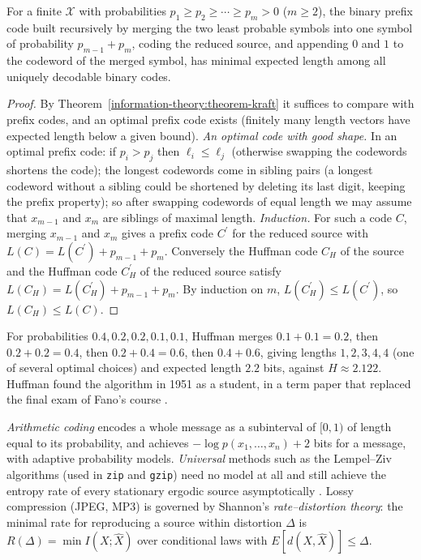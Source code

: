 \begin{theorem}[Huffman]\label{information-theory:theorem-huffman}
For a finite $\mathcal{X}$ with probabilities $p_1 \geq p_2 \geq \cdots \geq p_m > 0$ ($m \geq 2$), the binary prefix code built recursively by merging the two least probable symbols into one symbol of probability $p_{m-1} + p_m$,
coding the reduced source, and appending $0$ and $1$ to the codeword of the merged symbol, has minimal expected length among all uniquely decodable binary codes.
\end{theorem}

\begin{proof}
By Theorem~\ref{information-theory:theorem-kraft} it suffices to compare with prefix codes, and an optimal prefix code exists (finitely many length vectors have expected length below a given bound). \emph{An optimal code with
good shape.} In an optimal prefix code: if $p_i > p_j$ then $\ell_i \leq \ell_j$ (otherwise swapping the codewords shortens the code); the longest codewords come in sibling pairs (a longest codeword without a sibling could be
shortened by deleting its last digit, keeping the prefix property); so after swapping codewords of equal length we may assume that $x_{m-1}$ and $x_m$ are siblings of maximal length. \emph{Induction.} For such a code $C$,
merging $x_{m-1}$ and $x_m$ gives a prefix code $C^{\prime}$ for the reduced source with $L(C) = L(C^{\prime}) + p_{m-1} + p_m$. Conversely the Huffman code $C_H$ of the source and the Huffman code $C_H^{\prime}$ of the reduced source satisfy
$L(C_H) = L(C_H^{\prime}) + p_{m-1} + p_m$. By induction on $m$, $L(C_H^{\prime}) \leq L(C^{\prime})$, so $L(C_H) \leq L(C)$.
\end{proof}

\begin{example}\label{information-theory:example-huffman}
For probabilities $0.4, 0.2, 0.2, 0.1, 0.1$, Huffman merges $0.1 + 0.1 = 0.2$, then $0.2 + 0.2 = 0.4$, then $0.2 + 0.4 = 0.6$, then $0.4 + 0.6$, giving lengths $1, 2, 3, 4, 4$ (one of several optimal choices) and expected length
$2.2$ bits, against $H \approx 2.122$. Huffman found the algorithm in 1951 as a student, in a term paper that replaced the final exam of Fano's course \cite{huffman-1952}.
\end{example}

\begin{remark}\label{information-theory:remark-practical-compression}
\emph{Arithmetic coding} encodes a whole message as a subinterval of $[0, 1)$ of length equal to its probability, and achieves $-\log p(x_1, \ldots, x_n) + 2$ bits for a message, with adaptive probability models. \emph{Universal}
methods such as the Lempel--Ziv algorithms (used in \texttt{zip} and \texttt{gzip}) need no model at all and still achieve the entropy rate of every stationary ergodic source asymptotically \cite{cover-thomas}. Lossy
compression (JPEG, MP3) is governed by Shannon's \emph{rate--distortion theory}: the minimal rate for reproducing a source within distortion $\Delta$ is $R(\Delta) = \min I(X; \hat X)$ over conditional laws with
$E[d(X, \hat X)] \leq \Delta$.
\end{remark}


